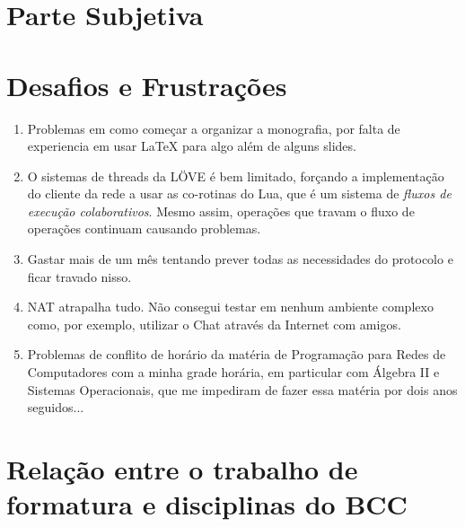 \chapter*{Parte Subjetiva}
\label{sec:parte_subjetiva}

\chapter{Desafios e Frustrações}
\label{sec:desafios_frustracoes}

  \begin{enumerate}
    \item Problemas em como começar a organizar a monografia, por falta de experiencia em
      usar \LaTeX{} para algo além de alguns slides.
    
    \item O sistemas de threads da LÖVE é bem limitado, forçando a implementação do cliente da rede
      a usar as co-rotinas do Lua, que é um sistema de \textit{fluxos de execução colaborativos}.
      Mesmo assim, operações que travam o fluxo de operações continuam causando problemas.
    
    \item Gastar mais de um mês tentando prever todas as necessidades do protocolo e ficar travado nisso.
    
    \item NAT atrapalha tudo. Não consegui testar em nenhum ambiente complexo como, por exemplo,
      utilizar o Chat através da Internet com amigos.

    \item Problemas de conflito de horário da matéria de Programação para Redes de Computadores com
      a minha grade horária, em particular com Álgebra II e Sistemas Operacionais, que me impediram de
      fazer essa matéria por dois anos seguidos...
  \end{enumerate}

\chapter{Relação entre o trabalho de formatura e disciplinas do BCC}
\label{sec:relacao_disciplinas_bcc}
\newcommand\materia[3]{\noindent \textbf{#1} - \texttt{#2}\\\indent #3\vspace{0.5cm}\\}

